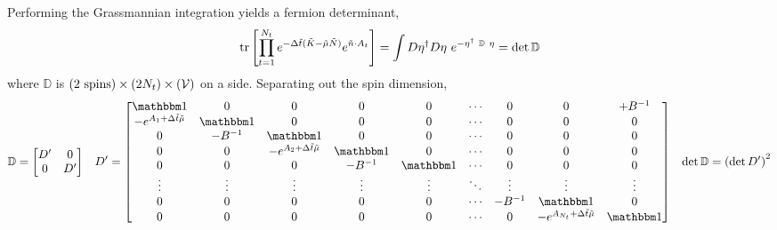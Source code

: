 Performing the Grassmannian integration yields a fermion determinant,
\begin{align}
	\text{tr}\left[\prod_{t=1}^{N_t} e^{-\Delta \tilde{t}(\tilde{K} - \tilde{\mu} \tilde{N})} e^{ \tilde{n}\cdot A_t} \right]
	=
	\int D\eta{}^{\dagger} D\eta ~ e^{- \eta^{\dagger} ~ \mathbb{D} ~ \eta} = \det \mathbb{D}
\end{align}
where $\mathbb{D}$ is $(2\text{ spins})\times(2N_t)\times(\mathcal{V})$ on a side.
Separating out the spin dimension,
\begin{align}
	\mathbb{D}
	&=
	\begin{bmatrix} D' & 0 \\ 0 & D' \end{bmatrix}
	&
	D'
	&=
	\begin{bmatrix} 
		\one                                & 0         & 0                                     & 0         & 0      & \cdots & 0       & 0                                         & +B^{-1}
	\\	-e^{A_1+\Delta\tilde{t}\tilde{\mu}} & \one      & 0                                     & 0         & 0      & \cdots & 0       & 0                                         & 0
	\\	0                                   & -B^{-1}   & \one                                  & 0         & 0      & \cdots & 0       & 0                                         & 0
	\\	0                                   & 0         & -e^{A_2+\Delta\tilde{t}\tilde{\mu}}   & \one      & 0      & \cdots & 0       & 0                                         & 0
	\\	0                                   & 0         & 0                                     & -B^{-1}   & \one   & \cdots & 0       & 0                                         & 0
	\\	\vdots                              & \vdots    & \vdots                                & \vdots    & \vdots & \ddots & \vdots  & \vdots                                    & \vdots
	\\	0                                   & 0         & 0                                     & 0         & 0      & \cdots & -B^{-1} & \one                                      & 0
	\\	0                                   & 0         & 0                                     & 0         & 0      & \cdots & 0       & -e^{A_{N_t}+\Delta\tilde{t}\tilde{\mu}}   & \one
	\end{bmatrix}
	&
	\det\mathbb{D} = \left(\det D'\right)^2
\end{align}
